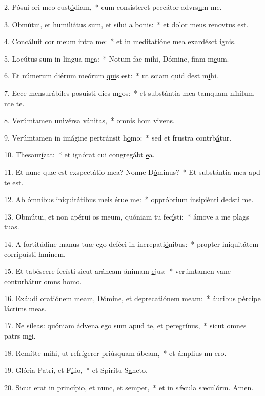 2. Pósui ori meo cust\uline{ó}diam,~* cum consísteret peccátor advrs\uline{u}m me.\par 
3. Obmútui, et humiliátus sum, et sílui a b\uline{o}nis:~* et dolor meus renovt\uline{u}s est.\par 
4. Concáluit cor meum \uline{i}ntra me:~* et in meditatióne mea exardésct \uline{i}gnis.\par 
5. Locútus sum in lingua m\uline{e}a:~* Notum fac mihi, Dómine, finm m\uline{e}um.\par 
6. Et númerum diérum meórum \uline{qui}s est:~* ut sciam quid dest m\uline{i}hi.\par 
7. Ecce mensurábiles posuísti dies m\uline{e}os:~* et substántia mea tamquam níhilum nt\uline{e} te.\par 
8. Verúmtamen univérsa v\uline{á}nitas,~* omnis hom v\uline{i}vens.\par 
9. Verúmtamen in imágine pertránsit h\uline{o}mo:~* sed et frustra contrb\uline{á}tur.\par 
10. Thesaur\uline{í}zat:~* et ignórat cui congregábt \uline{e}a.\par 
11. Et nunc quæ est exspectátio mea? Nonne D\uline{ó}minus?~* Et substántia mea apd t\uline{e} est.\par 
12. Ab ómnibus iniquitátibus meis éru\uline{e} me:~* oppróbrium insipiénti dedst\uline{i} me.\par 
13. Obmútui, et non apérui os meum, quóniam tu fec\uline{í}sti:~* ámove a me plags t\uline{u}as.\par 
14. A fortitúdine manus tuæ ego deféci in increpati\uline{ó}nibus:~* propter iniquitátem corripuísti hm\uline{i}nem.\par 
15. Et tabéscere fecísti sicut aráneam ánimam \uline{e}jus:~* verúmtamen vane conturbátur omns h\uline{o}mo.\par 
16. Exáudi oratiónem meam, Dómine, et deprecatiónem m\uline{e}am:~* áuribus pércipe lácrims m\uline{e}as.\par 
17. Ne síleas: quóniam ádvena ego sum apud te, et peregr\uline{í}nus,~* sicut omnes patrs m\uline{e}i.\par 
18. Remítte mihi, ut refrígerer priúsquam \uline{á}beam,~* et ámplius nn \uline{e}ro.\par 
19. Glória Patri, et F\uline{í}lio,~* et Spirítu S\uline{a}ncto.\par 
20. Sicut erat in princípio, et nunc, et s\uline{e}mper,~* et in sǽcula sæculórm. \uline{A}men.\par 
